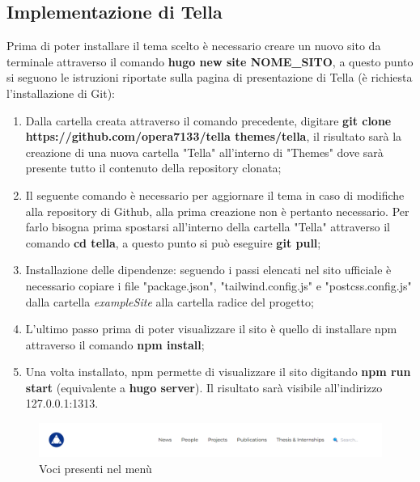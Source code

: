 \documentclass[target=bach,aauheader=]{thud}
\begin{document}
\subsection{Implementazione di Tella}
Prima di poter installare il tema scelto è necessario creare un nuovo sito da terminale attraverso il comando \textbf{hugo new site NOME\_SITO}, a questo punto si seguono le istruzioni riportate sulla pagina di presentazione di Tella (è richiesta l'installazione di Git):
\begin{enumerate}
    \item Dalla cartella creata attraverso il comando precedente, digitare \newline \textbf{git clone https://github.com/opera7133/tella themes/tella}, il risultato sarà la creazione di una nuova cartella "Tella" all'interno di "Themes" dove sarà presente tutto il contenuto della repository clonata;
    \item Il seguente comando è necessario per aggiornare il tema in caso di modifiche alla repository di Github, alla prima creazione non è pertanto necessario. Per farlo bisogna prima spostarsi all'interno della cartella "Tella" attraverso il comando \textbf{cd tella}, a questo punto si può eseguire \textbf{git pull};
    \item Installazione delle dipendenze: seguendo i passi elencati nel sito ufficiale è necessario copiare i file "package.json", "tailwind.config.js" e "postcss.config.js" dalla cartella \textit{exampleSite} alla cartella radice del progetto;
    \item L'ultimo passo prima di poter visualizzare il sito è quello di installare npm attraverso il comando \textbf{npm install};
    \item Una volta installato, npm permette di visualizzare il sito digitando \textbf{npm run start} (equivalente a \textbf{hugo server}). Il risultato sarà visibile all'indirizzo 127.0.0.1:1313.
\end{enumerate}

\begin{figure}[b]
    \centering
    \includegraphics[width = 1\textwidth]{images/Tella-menu.png}
    \caption{Voci presenti nel menù}
    \label{img:menu}
\end{figure}
\end{document}
